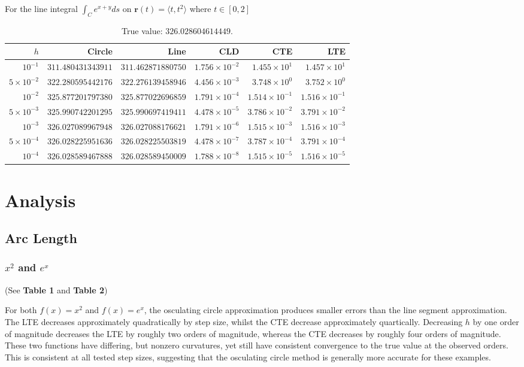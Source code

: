 \documentclass{article}
\begin{document}
For the line integral $\int_{C}e^{x+y}ds$ on $\mathbf{r}(t)=\langle t, t^2\rangle$ where $t\in[0,2]$
\begin{table}[h]
\centering
\begin{tabular}{rrrrrr}
\hline
$h$ & Circle & Line & CLD & CTE & LTE\\
\hline
$10^{-1}$ & $311.480431343911$ & $311.462871880750$ & $1.756\times10^{-2}$ & $1.455\times10^{1}$ & $1.457\times10^{1}$\\
$5\times10^{-2}$ & $322.280595442176$ & $322.276139458946$ & $4.456\times10^{-3}$ & $3.748\times10^{0}$ & $3.752\times10^{0}$\\
$10^{-2}$ & $325.877201797380$ & $325.877022696859$ & $1.791\times10^{-4}$ & $1.514\times10^{-1}$ & $1.516\times10^{-1}$\\
$5\times10^{-3}$ & $325.990742201295$ & $325.990697419411$ & $4.478\times10^{-5}$ & $3.786\times10^{-2}$ & $3.791\times10^{-2}$\\
$10^{-3}$ & $326.027089967948$ & $326.027088176621$ & $1.791\times10^{-6}$ & $1.515\times10^{-3}$ & $1.516\times10^{-3}$\\
$5\times10^{-4}$ & $326.028225951636$ & $326.028225503819$ & $4.478\times10^{-7}$ & $3.787\times10^{-4}$ & $3.791\times10^{-4}$\\
$10^{-4}$ & $326.028589467888$ & $326.028589450009$ & $1.788\times10^{-8}$ & $1.515\times10^{-5}$ & $1.516\times10^{-5}$\\
\hline
\end{tabular}
\caption{True value: $326.028604614449$.}
\end{table}

\newpage

\section{Analysis}
\subsection{Arc Length}
\label{subsec:arc_length}
\subsubsection{$x^2$ and $e^x$}
(See \textbf{Table 1} and \textbf{Table 2})

For both $f(x)=x^2$ and $f(x)=e^x$, the osculating circle approximation produces smaller errors than the line segment approximation. The LTE decreases approximately quadratically by step size, whilst the CTE decrease approximately quartically. Decreasing $h$ by one order of magnitude decreases the LTE by roughly two orders of magnitude, whereas the CTE decreases by roughly four orders of magnitude. These two functions have differing, but nonzero curvatures, yet still have consistent convergence to the true value at the observed orders. This is consistent at all tested step sizes, suggesting that the osculating circle method is generally more accurate for these examples.
\end{document}
